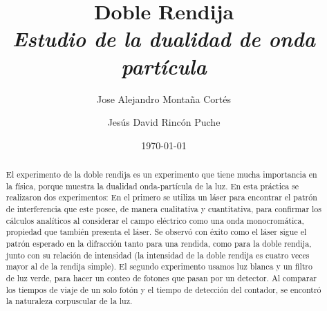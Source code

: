 \documentclass[%
 reprint,
 amsmath,amssymb,
 aps,
]{revtex4-1}
\newcommand{\subtitle}[1]{%
\posttitle{%
    \par\end{center}
\begin{center}\large#1\end{center}
\vskip0.5em}%
}
\begin{document}

\title{Doble Rendija\\ \textit{Estudio de la dualidad de onda partícula} }%


\author{Jose Alejandro Montaña Cortés}
\author{Jesús David Rincón Puche}%
%


\date{\today}%

\begin{abstract}

El experimento de la doble rendija es un experimento que tiene mucha importancia en la física, porque muestra la dualidad onda-partícula de la luz. En esta práctica se realizaron dos experimentos: En el primero se utiliza un láser para encontrar el patrón de interferencia que este posee, de manera cualitativa y cuantitativa, para confirmar los cálculos analíticos al considerar el campo eléctrico como una onda monocromática, propiedad que también presenta el láser. Se observó con éxito como el láser sigue el patrón esperado en la difracción tanto para una rendida, como para la doble rendija, junto con su relación de intensidad (la intensidad de la doble rendija es cuatro veces mayor al de la rendija simple). El segundo experimento usamos luz blanca y un filtro de luz verde, para hacer un conteo de fotones que pasan por un detector. Al comparar los tiempos de viaje de un solo fotón y el tiempo de detección del contador, se encontró la naturaleza corpuscular de la luz.

\end{abstract}
\maketitle

\end{document}
